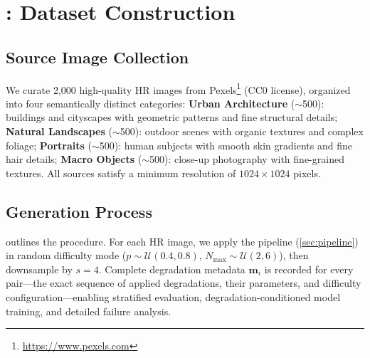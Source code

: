 \section{\dataset: Dataset Construction}
\label{sec:dataset}

\subsection{Source Image Collection}
\label{sec:dataset_collection}

We curate 2{,}000 high-quality HR images from Pexels\footnote{\url{https://www.pexels.com}} (CC0 license), organized into four semantically distinct categories:
\textbf{Urban Architecture} (${\sim}$500): buildings and cityscapes with geometric patterns and fine structural details;
\textbf{Natural Landscapes} (${\sim}$500): outdoor scenes with organic textures and complex foliage;
\textbf{Portraits} (${\sim}$500): human subjects with smooth skin gradients and fine hair details;
\textbf{Macro Objects} (${\sim}$500): close-up photography with fine-grained textures.
All sources satisfy a minimum resolution of $1024 \times 1024$ pixels.

\subsection{Generation Process}
\label{sec:dataset_generation}

 outlines the procedure.
For each HR image, we apply the \pipeline pipeline (\cref{sec:pipeline}) in random difficulty mode ($p \sim \mathcal{U}(0.4, 0.8)$, $N_{\max} \sim \mathcal{U}(2, 6)$), then downsample by $s{=}4$.
Complete degradation metadata $\mathbf{m}_i$ is recorded for every pair---the exact sequence of applied degradations, their parameters, and difficulty configuration---enabling stratified evaluation, degradation-conditioned model training, and detailed failure analysis.

